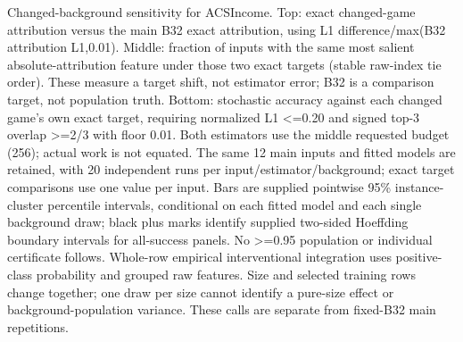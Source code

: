 Changed-background sensitivity for ACSIncome. Top: exact changed-game attribution versus the main B32 exact attribution, using L1 difference/max(B32 attribution L1,0.01). Middle: fraction of inputs with the same most salient absolute-attribution feature under those two exact targets (stable raw-index tie order). These measure a target shift, not estimator error; B32 is a comparison target, not population truth. Bottom: stochastic accuracy against each changed game's own exact target, requiring normalized L1 <=0.20 and signed top-3 overlap >=2/3 with floor 0.01. Both estimators use the middle requested budget (256); actual work is not equated. The same 12 main inputs and fitted models are retained, with 20 independent runs per input/estimator/background; exact target comparisons use one value per input. Bars are supplied pointwise 95\% instance-cluster percentile intervals, conditional on each fitted model and each single background draw; black plus marks identify supplied two-sided Hoeffding boundary intervals for all-success panels. No >=0.95 population or individual certificate follows. Whole-row empirical interventional integration uses positive-class probability and grouped raw features. Size and selected training rows change together; one draw per size cannot identify a pure-size effect or background-population variance. These calls are separate from fixed-B32 main repetitions.
